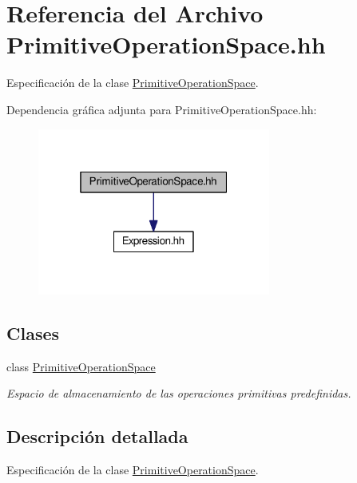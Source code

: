 \hypertarget{_primitive_operation_space_8hh}{}\section{Referencia del Archivo Primitive\+Operation\+Space.\+hh}
\label{_primitive_operation_space_8hh}


Especificación de la clase \hyperlink{class_primitive_operation_space}{Primitive\+Operation\+Space}.  


Dependencia gráfica adjunta para Primitive\+Operation\+Space.\+hh\+:
\nopagebreak
\begin{figure}[H]
\begin{center}
\leavevmode
\includegraphics[width=217pt]{_primitive_operation_space_8hh__incl}
\end{center}
\end{figure}
\subsection*{Clases}
\begin{DoxyCompactItemize}
\item 
class \hyperlink{class_primitive_operation_space}{Primitive\+Operation\+Space}
\begin{DoxyCompactList}\small\item\em Espacio de almacenamiento de las operaciones primitivas predefinidas. \end{DoxyCompactList}\end{DoxyCompactItemize}


\subsection{Descripción detallada}
Especificación de la clase \hyperlink{class_primitive_operation_space}{Primitive\+Operation\+Space}. 


